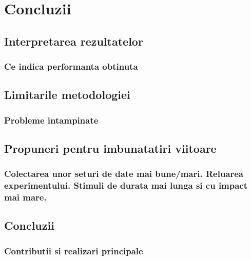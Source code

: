 \chapter{Concluzii}

\section{Interpretarea rezultatelor}
\subsection{Ce indica performanta obtinuta}

\section{Limitarile metodologiei}
\subsection{Probleme intampinate}

\section{Propuneri pentru imbunatatiri viitoare}
\subsection{Colectarea unor seturi de date mai bune/mari. Reluarea experimentului. Stimuli de durata mai lunga si cu impact mai mare.}

\section{Concluzii}
\subsection{Contributii si realizari principale}